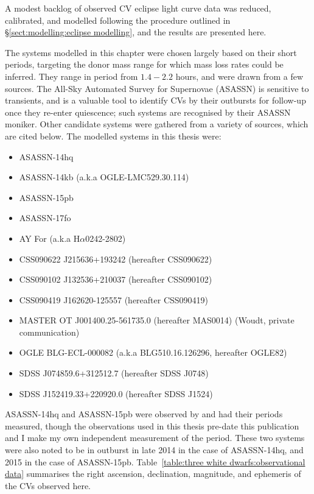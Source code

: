 \label{chpt:results:characterisation of 12 new CVs} %

A modest backlog of observed CV eclipse light curve data was reduced, calibrated, and modelled following the procedure outlined in \S\ref{sect:modelling:eclipse modelling}, and the results are presented here.

The systems modelled in this chapter were chosen largely based on their short periods, targeting the donor mass range for which mass loss rates could be inferred. They range in period from $1.4 - 2.2$ hours, and were drawn from a few sources.
The All-Sky Automated Survey for Supernovae (ASASSN) \citep{shappee2014} is sensitive to transients, and is a valuable tool to identify CVs by their outbursts for follow-up once they re-enter quiescence; such systems are recognised by their ASASSN moniker.
Other candidate systems were gathered from a variety of sources, which are cited below.
The modelled systems in this thesis were:
\begin{itemize}
    \setlength\itemsep{0em}
    \item ASASSN-14hq
    \item ASASSN-14kb (a.k.a OGLE-LMC529.30.114)
    \item ASASSN-15pb
    \item ASASSN-17fo
    \item AY For (a.k.a H$\alpha$0242-2802) \citep{woudt2004}
    \item CSS090622 J215636+193242 (hereafter CSS090622) \citep{kato2012,thorstensen2016}
    \item CSS090102 J132536+210037 (hereafter CSS090102) \citep{kato2012}
    \item CSS090419 J162620-125557 (hereafter CSS090419) \citep{kato2012}
    \item MASTER OT J001400.25-561735.0 (hereafter MAS0014) (Woudt, private communication)
    \item OGLE BLG-ECL-000082 (a.k.a BLG510.16.126296, hereafter OGLE82) \citep{soszynski2016}
    \item SDSS J074859.6+312512.7 (hereafter SDSS J0748) \citep{kato2016}
    \item SDSS J152419.33+220920.0 (hereafter SDSS J1524) \citep{southworth2010,michel2013}
\end{itemize}
\newpage
ASASSN-14hq and ASASSN-15pb were observed by \citet{paterson2019} and had their periods measured, though the observations used in this thesis pre-date this publication and I make my own independent measurement of the period.
These two systems were also noted to be in outburst in late 2014 in the case of ASASSN-14hq, and 2015 in the case of ASASSN-15pb.
Table~\ref{table:three white dwarfs:observational data} summarises the right ascension, declination, magnitude, and ephemeris of the CVs observed here.

